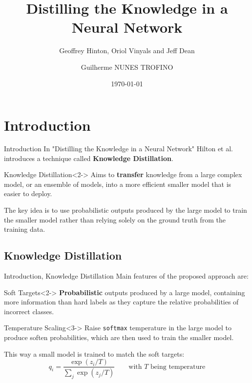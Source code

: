 \documentclass[aspectratio=1610]{beamer}
\date{\today}
\title{Distilling the Knowledge in a Neural Network}
\subtitle{Geoffrey Hinton, Oriol Vinyals and Jeff Dean}
\author{Guilherme NUNES TROFINO}
\institute{ENSTA Paris}
\begin{document}
    \maketitle


    \section*{Introduction}

    \begin{frame}{Introduction}
        In "Distilling the Knowledge in a Neural Network" Hilton et al. introduces a technique called \textbf{Knowledge Distillation}.

        \begin{alertblock}{Knowledge Distillation}<2->
            Aims to \textbf{transfer} knowledge from a large complex model, or an ensemble of models, into a more efficient smaller model that is easier to deploy.
        \end{alertblock}

        The key idea is to use probabilistic outputs produced by the large model to train the smaller model rather than relying solely on the ground truth from the training data.
    \end{frame}

    \subsection*{Knowledge Distillation}
    \begin{frame}{Introduction, Knowledge Distillation}
        Main features of the proposed approach are:

        \begin{block}{Soft Targets}<2->
            \textbf{Probabilistic} outputs produced by a large model, containing more information than hard labels as they capture the relative probabilities of incorrect classes.
        \end{block}

        \begin{block}{Temperature Scaling}<3->
            Raise \texttt{softmax} temperature in the large model to produce soften probabilities, which are then used to train the smaller model.
        \end{block}

        This way a small model is trained to match the soft targets:
        \begin{equation}
            \boxed{
                q_i = \frac{\exp(z_i / T)}{\sum_j \exp(z_j / T)}
            }
            \qquad
            \text{with $T$ being temperature}
        \end{equation}
    \end{frame}
\end{document}
